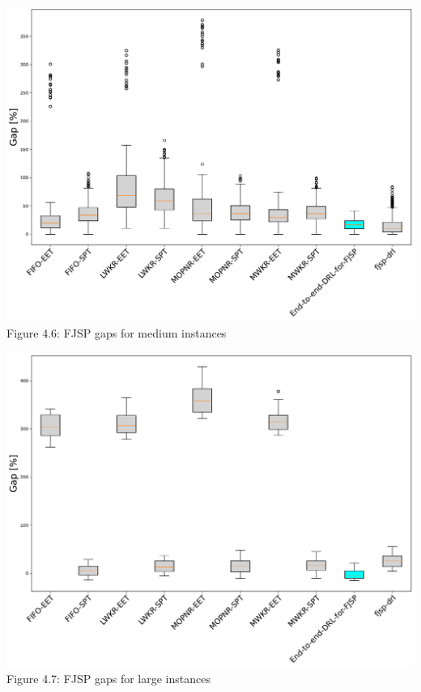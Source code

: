 \begin{center}
    \includegraphics[width=0.9\linewidth]{images/horizontal_boxplot_fjsp_medium.pdf}\\
    Figure 4.6: FJSP gaps for medium instances
\end{center}
\begin{center}
    \includegraphics[width=0.9\linewidth]{images/horizontal_boxplot_fjsp_large.pdf}\\
    Figure 4.7: FJSP gaps for large instances
\end{center}
